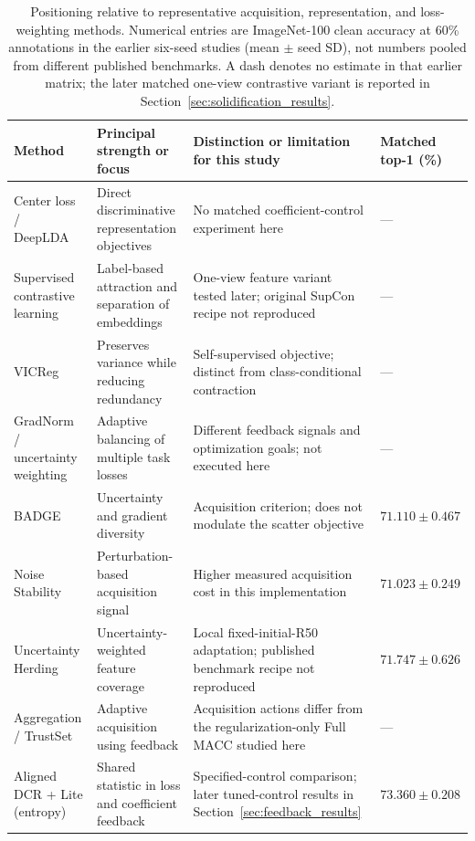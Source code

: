 \documentclass[10pt,a4paper,twocolumn]{article}
\begin{document}
\begin{table}[tbp]
\caption{Positioning relative to representative acquisition, representation,
and loss-weighting methods. Numerical entries are ImageNet-100 clean accuracy
at 60\% annotations in the earlier six-seed studies (mean $\pm$ seed SD),
not numbers pooled from different published benchmarks. A dash denotes
no estimate in that earlier matrix; the later matched one-view
contrastive variant is reported in Section~\ref{sec:solidification_results}.}
\label{tab:related_positioning}
\centering\small
\begin{tabularx}{\textwidth}{@{}>{\raggedright\arraybackslash}p{}YY>{\raggedright\arraybackslash}p{.14\textwidth}@{}}
\toprule
Method & Principal strength or focus & Distinction or limitation for this study & Matched top-1 (\%) \\
\midrule
Center loss / DeepLDA~\cite{wen2016center,dorfer2016deeplda} &
Direct discriminative representation objectives &
No matched coefficient-control experiment here & --- \\
Supervised contrastive learning~\cite{khosla2020supervised} &
Label-based attraction and separation of embeddings &
One-view feature variant tested later; original SupCon recipe not reproduced & --- \\
VICReg~\cite{bardes2022vicreg} &
Preserves variance while reducing redundancy &
Self-supervised objective; distinct from class-conditional contraction & --- \\
GradNorm / uncertainty weighting~\cite{chen2018gradnorm,kendall2018uncertainty} &
Adaptive balancing of multiple task losses &
Different feedback signals and optimization goals; not executed here & --- \\
BADGE~\cite{ash2020badge} & Uncertainty and gradient diversity &
Acquisition criterion; does not modulate the scatter objective & $71.110\pm0.467$ \\
Noise Stability~\cite{li2024noise} & Perturbation-based acquisition signal &
Higher measured acquisition cost in this implementation & $71.023\pm0.249$ \\
Uncertainty Herding~\cite{bae2025uncertainty} & Uncertainty-weighted feature coverage &
Local fixed-initial-R50 adaptation; published benchmark recipe not reproduced & $71.747\pm0.626$ \\
Aggregation / TrustSet~\cite{jung2026aggregation,cui2026trustset} &
Adaptive acquisition using feedback & Acquisition actions differ from the regularization-only Full MACC studied here & --- \\
Aligned DCR + Lite (entropy) & Shared statistic in loss and coefficient feedback &
Specified-control comparison; later tuned-control results in Section~\ref{sec:feedback_results} & $73.360\pm0.208$ \\
\bottomrule
\end{tabularx}
\end{table}
\end{document}
